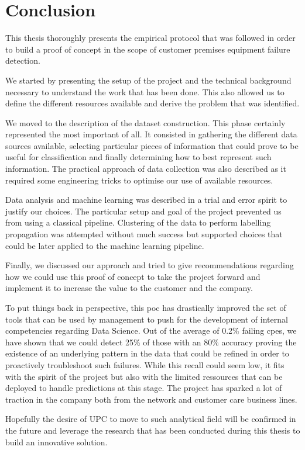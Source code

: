\chapter{Conclusion}
This thesis thoroughly presents the empirical protocol that was followed in order to build a proof of concept in the scope of customer premises equipment failure detection.

We started by presenting the setup of the project and the technical background necessary to understand the work that has been done. This also allowed us to define the different resources available and derive the problem that was identified.

We moved to the description of the dataset construction. This phase certainly represented the most important of all. It consisted in gathering the different data sources available, selecting particular pieces of information that could prove to be useful for classification and finally determining how to best represent such information. The practical approach of data collection was also described as it required some engineering tricks to optimise our use of available resources.

Data analysis and machine learning was described in a trial and error spirit to justify our choices. The particular setup and goal of the project prevented us from using a classical pipeline. Clustering of the data to perform labelling propagation was attempted without much success but supported choices that could be later applied to the machine learning pipeline. 

Finally, we discussed our approach and tried to give recommendations regarding how we could use this proof of concept to take the project forward and implement it to increase the value to the customer and the company. 

To put things back in perspective, this \acrshort{poc} has drastically improved the set of tools that can be used by management to push for the development of internal competencies regarding Data Science. Out of the average of 0.2\% failing \acrshort{cpe}s, we have shown that we could detect 25\% of those with an 80\% accuracy proving the existence of an underlying pattern in the data that could be refined in order to proactively troubleshoot such failures. While this recall could seem low, it fits with the spirit of the project but also with the limited ressources that can be deployed to handle predictions at this stage. The project has sparked a lot of traction in the company both from the network and customer care business lines. 

Hopefully the desire of UPC to move to such analytical field will be confirmed in the future and leverage the research that has been conducted during this thesis to build an innovative solution.